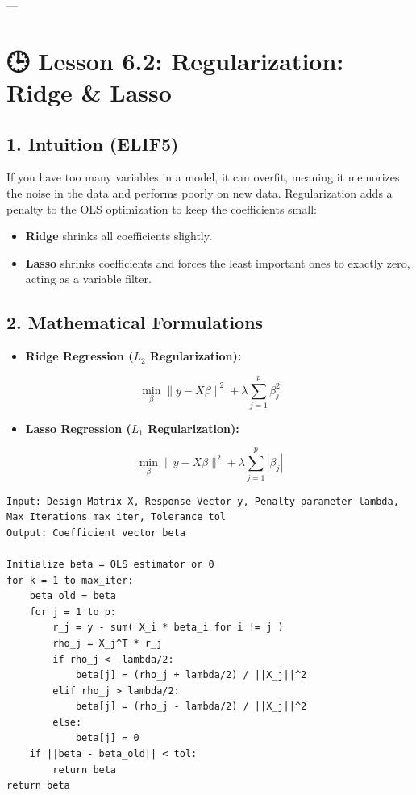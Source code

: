 \documentclass[11pt,oneside]{book}
\begin{document}
---

\section{🕒 Lesson 6.2: Regularization: Ridge \& Lasso}

\subsection{1. Intuition (ELIF5)}
If you have too many variables in a model, it can overfit, meaning it memorizes the noise in the data and performs poorly on new data. Regularization adds a penalty to the OLS optimization to keep the coefficients small:
\begin{itemize}
  \item \textbf{Ridge} shrinks all coefficients slightly.
  \item \textbf{Lasso} shrinks coefficients and forces the least important ones to exactly zero, acting as a variable filter.
\end{itemize}

\subsection{2. Mathematical Formulations}
\begin{itemize}
  \item \textbf{Ridge Regression ($L_2$ Regularization):}
\end{itemize}
  $$\min_{\beta} \|y - X\beta\|^2 + \lambda \sum_{j=1}^p \beta_j^2$$
\begin{itemize}
  \item \textbf{Lasso Regression ($L_1$ Regularization):}
\end{itemize}
  $$\min_{\beta} \|y - X\beta\|^2 + \lambda \sum_{j=1}^p |\beta_j|$$

\begin{tcolorbox}[colback=white,colframe=black,boxrule=0.6pt,arc=0mm,title=Lasso Coordinate Descent]
\begin{verbatim}
Input: Design Matrix X, Response Vector y, Penalty parameter lambda, Max Iterations max_iter, Tolerance tol
Output: Coefficient vector beta

Initialize beta = OLS estimator or 0
for k = 1 to max_iter:
    beta_old = beta
    for j = 1 to p:
        r_j = y - sum( X_i * beta_i for i != j )
        rho_j = X_j^T * r_j
        if rho_j < -lambda/2:
            beta[j] = (rho_j + lambda/2) / ||X_j||^2
        elif rho_j > lambda/2:
            beta[j] = (rho_j - lambda/2) / ||X_j||^2
        else:
            beta[j] = 0
    if ||beta - beta_old|| < tol:
        return beta
return beta
\end{verbatim}
\end{tcolorbox}
\end{document}
